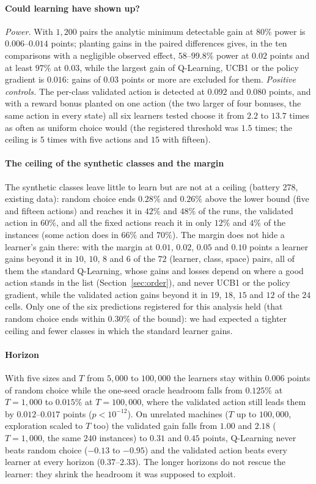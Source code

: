 \paragraph{Could learning have shown up?} \emph{Power.} With $1{,}200$ pairs the analytic minimum detectable gain at $80\%$ power is $0.006$--$0.014$ points; planting gains in the paired differences gives, in the ten comparisons with a negligible observed effect, $58$--$99.8\%$ power at $0.02$ points and at least $97\%$ at $0.03$, while the largest gain of Q-Learning, UCB1 or the policy gradient is $0.016$: gains of $0.03$ points or more are excluded for them. \emph{Positive controls.} The per-class validated action is detected at $0.092$ and $0.080$ points, and with a reward bonus planted on one action (the two larger of four bonuses, the same action in every state) all six learners tested choose it from $2.2$ to $13.7$ times as often as uniform choice would (the registered threshold was $1.5$ times; the ceiling is $5$ times with five actions and $15$ with fifteen).

\paragraph{The ceiling of the synthetic classes and the margin} The synthetic classes leave little to learn but are not at a ceiling (battery 278, existing data): random choice ends $0.28\%$ and $0.26\%$ above the lower bound (five and fifteen actions) and reaches it in $42\%$ and $48\%$ of the runs, the validated action in $60\%$, and all the fixed actions reach it in only $12\%$ and $4\%$ of the instances (some action does in $66\%$ and $70\%$). The margin does not hide a learner's gain there: with the margin at $0.01$, $0.02$, $0.05$ and $0.10$ points a learner gains beyond it in $10$, $10$, $8$ and $6$ of the $72$ (learner, class, space) pairs, all of them the standard Q-Learning, whose gains and losses depend on where a good action stands in the list (Section~\ref{sec:order}), and never UCB1 or the policy gradient, while the validated action gains beyond it in $19$, $18$, $15$ and $12$ of the $24$ cells. Only one of the six predictions registered for this analysis held (that random choice ends within $0.30\%$ of the bound): we had expected a tighter ceiling and fewer classes in which the standard learner gains.

\paragraph{Horizon} With five sizes and $T$ from $5{,}000$ to $100{,}000$ the learners stay within $0.006$ points of random choice while the one-seed oracle headroom falls from $0.125\%$ at $T=1{,}000$ to $0.015\%$ at $T=100{,}000$, where the validated action still leads them by $0.012$--$0.017$ points ($p<10^{-12}$). On unrelated machines ($T$ up to $100{,}000$, exploration scaled to $T$ too) the validated gain falls from $1.00$ and $2.18$ ($T=1{,}000$, the same $240$ instances) to $0.31$ and $0.45$ points, Q-Learning never beats random choice ($-0.13$ to $-0.95$) and the validated action beats every learner at every horizon ($0.37$--$2.33$). The longer horizons do not rescue the learner: they shrink the headroom it was supposed to exploit.

